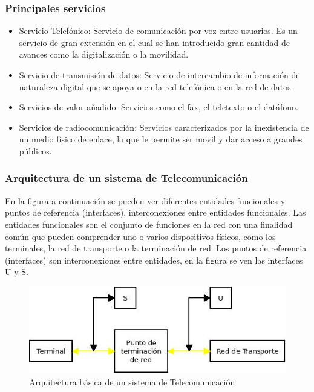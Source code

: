 \subsubsection{Principales servicios}
\begin{itemize}
	\item Servicio Telefónico: Servicio de comunicación por voz entre usuarios. Es un servicio de gran extensión en el cual se han introducido gran cantidad de avances como la digitalización o la movilidad.
	\item Servicio de transmisión de datos: Servicio de intercambio de información de naturaleza digital que se apoya o en la red telefónica o en la red de datos.
	\item Servicios de valor añadido: Servicios como el fax, el teletexto o el datáfono.
	\item Servicios de radiocomunicación: Servicios caracterizados por la inexistencia de un medio físico de enlace, lo que le permite ser movil y dar acceso a grandes públicos.
\end{itemize}
\subsubsection{Arquitectura de un sistema de Telecomunicación}
En la figura a continuación se pueden ver diferentes entidades funcionales y puntos de referencia (interfaces), interconexiones entre entidades funcionales. Las entidades funcionales son el conjunto de funciones en la red con una finalidad común que pueden comprender uno o varios dispositivos físicos, como los terminales, la red de transporte o la terminación de red. Los puntos de referencia (interfaces) son interconexiones entre entidades, en la figura se ven las interfaces U y S.
\begin{figure}[H]
\centering
\includegraphics[width=\textwidth]{Imagen/arquisistemateleco.jpg}
\caption{Arquitectura básica de un sistema de Telecomunicación}
\label{}
\end{figure}
